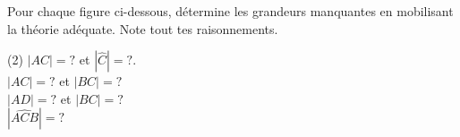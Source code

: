 %
%
    Pour chaque figure ci-dessous, détermine les grandeurs manquantes en mobilisant la théorie adéquate. Note tout tes raisonnements.

    \begin{tasks}(2)
        \task $|AC| = ?$ et $|\widehat{C}|=?$.\\
        \task $|AC|=?$ et $|BC|=?$\\
        \task $|AD|=?$ et $|BC|=?$\\
        \task $|\widehat{ACB}|=?$\\
    \end{tasks}
